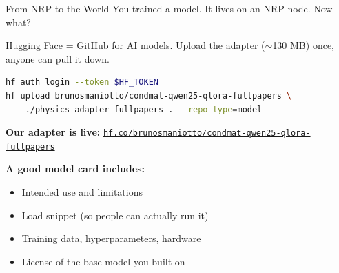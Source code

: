 \documentclass[aspectratio=169]{beamer}
\begin{document}
\begin{frame}[fragile]{From NRP to the World}
    You trained a model. It lives on an NRP node. Now what?

    \vspace{0.6em}
    \href{https://huggingface.co}{Hugging Face} = GitHub for AI models. Upload the adapter ($\sim$130 MB) once, anyone can pull it down.

    \vspace{0.5em}
    \begin{lstlisting}[language=bash]
hf auth login --token $HF_TOKEN
hf upload brunosmaniotto/condmat-qwen25-qlora-fullpapers \
    ./physics-adapter-fullpapers . --repo-type=model
    \end{lstlisting}

    \vspace{0.4em}
    \textbf{Our adapter is live:} \href{https://huggingface.co/brunosmaniotto/condmat-qwen25-qlora-fullpapers}{\texttt{hf.co/brunosmaniotto/condmat-qwen25-qlora-fullpapers}}

    \vspace{0.6em}
    \textbf{A good model card includes:}
    \begin{itemize}
        \item Intended use and limitations
        \item Load snippet (so people can actually run it)
        \item Training data, hyperparameters, hardware
        \item License of the base model you built on
    \end{itemize}
\end{frame}
\end{document}
